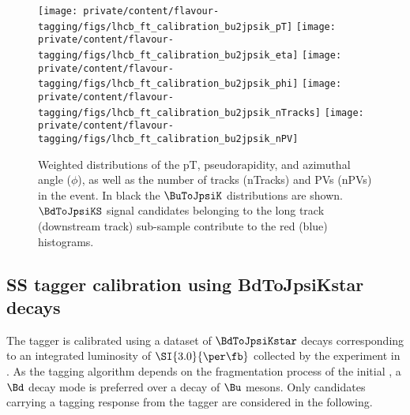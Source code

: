 %
\begin{figure}
  \centering
  \texttt{[image: private/content/flavour-tagging/figs/lhcb\_ft\_calibration\_bu2jpsik\_pT]}
  \texttt{[image: private/content/flavour-tagging/figs/lhcb\_ft\_calibration\_bu2jpsik\_eta]}
  \texttt{[image: private/content/flavour-tagging/figs/lhcb\_ft\_calibration\_bu2jpsik\_phi]}
  \texttt{[image: private/content/flavour-tagging/figs/lhcb\_ft\_calibration\_bu2jpsik\_nTracks]}
  \texttt{[image: private/content/flavour-tagging/figs/lhcb\_ft\_calibration\_bu2jpsik\_nPV]}
  \caption{Weighted distributions of the \Bmeson \acf{pT}, \acf{pseudorapidity},
  and azimuthal angle ($\phi$), as well as the number of tracks (nTracks) and
  \aclp{PV} (n\acsp{PV}) in the event. In black the $\BuToJpsiK$ distributions
  are shown. $\BdToJpsiKS$ signal candidates belonging to the long track
  (downstream track) sub-sample contribute to the red (blue) histograms.
  \cite{FT:RunI}}
  \label{fig:flavour_tagging:calibration:os:parameter_distributions}
\end{figure}
%

\subsection{\ac{SS} tagger calibration using BdToJpsiKstar decays}
\label{sec:flavour_tagging:calibration:ss}

%
The \SSpi tagger is calibrated using a dataset of $\BdToJpsiKstar$ decays
corresponding to an integrated luminosity of $\SI{3.0}{\per\fb}$ collected by
the \LHCb experiment in \RunOne. As the \SSpi tagging algorithm depends on the
fragmentation process of the initial \Bmeson, a $\Bd$ decay mode is preferred
over a decay of $\Bu$ mesons. Only candidates carrying a tagging response from
the \SSpi tagger are considered in the following.

